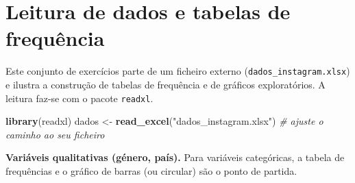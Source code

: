 \documentclass[
  portuguese,
  11pt,
  openany]{book}
\newenvironment{Shaded}{\begin{snugshade}}{\end{snugshade}}
\newcommand{\AttributeTok}[1]{\textcolor[rgb]{0.13,0.29,0.53}{#1}}
\newcommand{\CommentTok}[1]{\textcolor[rgb]{0.56,0.35,0.01}{\textit{#1}}}
\newcommand{\DecValTok}[1]{\textcolor[rgb]{0.00,0.00,0.81}{#1}}
\newcommand{\FunctionTok}[1]{\textcolor[rgb]{0.13,0.29,0.53}{\textbf{#1}}}
\newcommand{\NormalTok}[1]{#1}
\newcommand{\OtherTok}[1]{\textcolor[rgb]{0.56,0.35,0.01}{#1}}
\newcommand{\SpecialCharTok}[1]{\textcolor[rgb]{0.81,0.36,0.00}{\textbf{#1}}}
\newcommand{\StringTok}[1]{\textcolor[rgb]{0.31,0.60,0.02}{#1}}
\begin{document}
\section{Leitura de dados e tabelas de frequência}\label{leitura-de-dados-e-tabelas-de-frequuxeancia}

Este conjunto de exercícios parte de um ficheiro externo (\texttt{dados\_instagram.xlsx})
e ilustra a construção de tabelas de frequência e de gráficos exploratórios. A
leitura faz-se com o pacote \texttt{readxl}.

\begin{Shaded}
\begin{Highlighting}[]
\FunctionTok{library}\NormalTok{(readxl)}
\NormalTok{dados }\OtherTok{\textless{}{-}} \FunctionTok{read\_excel}\NormalTok{(}\StringTok{"dados\_instagram.xlsx"}\NormalTok{)   }\CommentTok{\# ajuste o caminho ao seu ficheiro}
\end{Highlighting}
\end{Shaded}

\textbf{Variáveis qualitativas (género, país).} Para variáveis categóricas, a tabela
de frequências e o gráfico de barras (ou circular) são o ponto de partida.

\begin{Shaded}
\end{Shaded}
\end{document}

